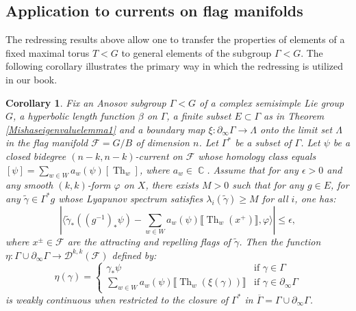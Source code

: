 \documentclass[12pt]{amsbook}%
\newtheorem{cor}[thm]{Corollary}
\theoremstyle{definition}
\theoremstyle{remark}
\numberwithin{section}{chapter}
\numberwithin{subsection}{section}
\numberwithin{figure}{chapter}
\DeclareMathOperator{\C}{\mathbb{C}}
\DeclareMathOperator{\Th}{Th}
\newcommand\intcur[1]{\llbracket #1 \rrbracket}
\def\cF{{\mathscr{F}}}
\def\tga{{\tilde{\gamma}}}
\def\Ga{\Gamma}
\def\ga{\gamma}
\def\geo{\partial_\infty}
\def\ol{\overline}
\def\zhao{\color{red}}
\begin{document}
{{%
%

\subsection{Application to currents on flag manifolds}


The redressing results above allow one to transfer the properties of elements of a fixed maximal torus $T< G$ 
to general elements of the subgroup $\Ga< G$. The following corollary illustrates 
the primary way in which the redressing is utilized in our book. 


\begin{cor} \label{cor_equivariant_continuous} Fix an Anosov subgroup $\Gamma< G$ of a complex semisimple Lie group $G$, a hyperbolic length function $\beta$ on $\Gamma$, a finite subset $E\subset \Gamma$ as in Theorem \ref{Mishaseigenvaluelemma1} and a boundary map $\xi \colon \partial_\infty \Gamma \to \Lambda$ onto the limit set $\Lambda$ in the flag manifold $\cF=G/B$ of dimension $n$. Let $\Gamma^*$ be a subset of $\Gamma$. Let $\psi$ be a closed bidegree $(n-k,n-k)$-current on $\cF$ whose homology class equals 
$[\psi] = \sum_{w\in W} a_w(\psi) [\Th_w]$, where $a_w \in \C$. 
    Assume that for any $\epsilon > 0$ and any smooth $(k,k)$-form $\varphi$ on $X$, there exists $M>0$ such that for any $g\in E$, for any $\tga\in\Gamma^*g$ whose Lyapunov spectrum satisfies $\lambda_i(\tga) \geqslant M $ for all $i$, one has: 
\begin{equation*}
	|\langle  \tga_* \left((g^{-1})_*\psi\right) -  \sum_{w\in W} a_w(\psi)  \intcur{\Th_w(x^+)} , \varphi  \rangle    | \leqslant \epsilon ,
\end{equation*}
where $x^\pm\in \cF$ are the attracting and repelling flags of $\tga$. 
Then the function $\eta \colon \Gamma \cup \partial_\infty \Gamma \to \mathcal{D}^{k,k}(\cF)$ 
defined by: 
\begin{equation}
	\eta (\ga ) = \left \lbrace  \begin{array}{ll}
		\ga_* \psi & \text{if } \ga\in \Gamma \\ 
		\sum_{w\in W } a_{w}(\psi) \intcur{\Th_w(\xi(\ga))} & \text{if } \ga\in \geo\Gamma
	\end{array}\right. 
\end{equation}
is weakly continuous when restricted to the closure of $\Gamma^*$ in $\ol{\Ga}=\Gamma\cup\geo \Gamma$. 
\end{cor}


}}
\end{document}
